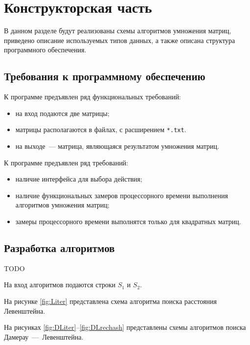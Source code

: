 \chapter{Конструкторская часть}
В данном разделе будут реализованы схемы алгоритмов умножения матриц, приведено описание используемых типов данных, а также описана структура программного обеспечения.

\section{Требования к программному обеспечению}\label{section:requirements_1}
К программе предъявлен ряд функциональных требований:
\begin{itemize}
    \item на вход подаются две матрицы;
    \item матрицы располагаются в файлах, с расширением \texttt{*.txt}.
    \item на выходе~--- матрица, являющаяся результатом умножения матриц.
\end{itemize}

К программе предъявлен ряд требований:
\begin{itemize}
	\item наличие интерфейса для выбора действия;
	\item наличие функциональных замеров процессорного времени выполнения алгоритмов умножения матриц;
	\item замеры процессорного времени выполнятся только для квадратных матриц.
\end{itemize}

\section{Разработка алгоритмов}
TODO

На вход алгоритмов подаются строки $S_1$ и $S_2$.

На рисунке \ref{fig:Liter} представлена схема алгоритма поиска расстояния Левенштейна.

На рисунках \ref{fig:DLiter}--\ref{fig:DLrechash} представлены схемы алгоритмов поиска Дамерау~---~Левенштейна.


